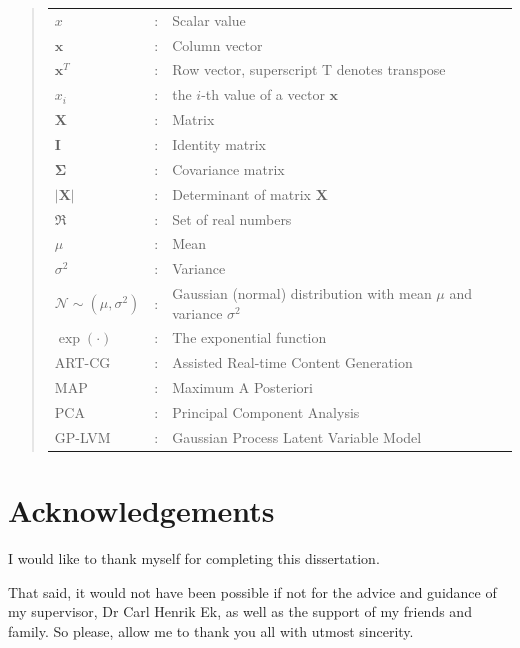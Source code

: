 \documentclass[ %
author={Dillon Keith Diep},
supervisor={Dr. Carl Henrik Ek},
degree={MEng},
title={ART-CG Hair:},
subtitle={Assisted Real-time Content Generation of Stylised Virtual Hair},
type={Research},
year={2017} ]{dissertation}
\begin{document}
\begin{quote}
	\noindent
	\begin{tabular}{lcl}
		$x$                 &:  & Scalar value\\
		$\bm{x}$            &:  & Column vector\\
		$\bm{x}^T$          &:  & Row vector, superscript T denotes transpose\\
		$x_i$               &:  & the $i$-th value of a vector $\bm{x}$\\
		$\bm{X}$            &:  & Matrix\\
		$\bm{I}$            &:  & Identity matrix\\
		$\bm{\Sigma}$           &:  & Covariance matrix\\
		$|\bm{X}|$          &:  & Determinant of matrix $\bm{X}$\\
		$\Re$               &:  & Set of real numbers\\
		$\mu$               &:  & Mean\\
		$\sigma^2$          &:  & Variance\\
		$\mathcal{N}\sim(\mu, \sigma^2)$            &:  & Gaussian (normal) distribution with mean $\mu$ and variance $\sigma^2$\\
		$\exp(\bm{\cdot})$  &:  & The exponential function\\
		ART-CG              &:  & Assisted Real-time Content Generation\\
		MAP                 &:  & Maximum A Posteriori\\
		PCA                 &:  & Principal Component Analysis\\
		GP-LVM              &:  & Gaussian Process Latent Variable Model\\
	\end{tabular}
\end{quote}


\chapter*{Acknowledgements}

I would like to thank myself for completing this dissertation. 

\noindent
That said, it would not have been possible if not for the advice and guidance of my supervisor, Dr Carl Henrik Ek, as well as the support of my friends and family. So please, allow me to thank you all with utmost sincerity.
\end{document}
